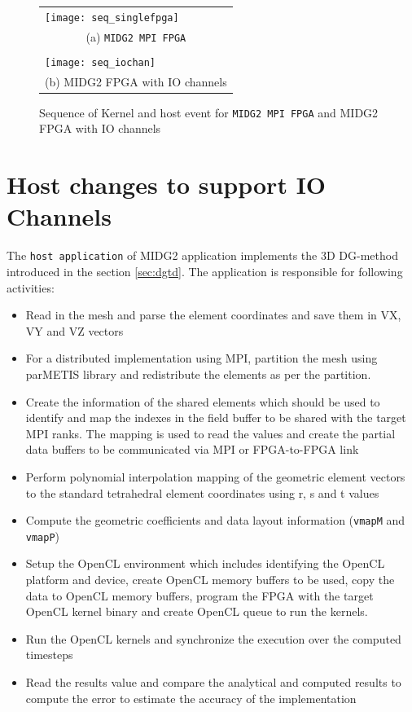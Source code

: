 \begin{figure}[h]
	\centering\small
	\begin{tabular}{l@{\hskip 0.5in}}
        \texttt{[image: seq\_singlefpga]} \\
        \multicolumn{1}{c}{(a) \texttt{MIDG2 MPI FPGA}}  \\
        \\
        \texttt{[image: seq\_iochan]} \\
        \multicolumn{1}{c}{(b) MIDG2 FPGA with IO channels}
	\end{tabular}
    \caption{Sequence of Kernel and host event for \texttt{MIDG2 MPI FPGA}
    and MIDG2 FPGA with IO channels}
	\label{fig:sequence_comp}
\end{figure}

\section{Host changes to support IO Channels}

The \texttt{host application} of MIDG2 application implements the 3D DG-method introduced in the section \ref{sec:dgtd}.
The application is responsible for following activities:

\begin{itemize}
    \item Read in the mesh and parse the element coordinates and save them in VX, VY and VZ vectors
    \item For a distributed implementation using MPI, partition the mesh using parMETIS library
    and redistribute the elements as per the partition.
    \item Create the information of the shared elements which should be used to identify and map the
    indexes in the field buffer to be shared with the target MPI ranks. The mapping is used to read the
    values and create the partial data buffers to be communicated via MPI or FPGA-to-FPGA link
    \item Perform polynomial interpolation mapping of the geometric element vectors to the standard tetrahedral
    element coordinates using r, s and t values
    \item Compute the geometric coefficients and data layout information (\texttt{vmapM} and \texttt{vmapP})
    \item Setup the OpenCL environment which includes identifying the OpenCL platform and device,
    create OpenCL memory buffers to be used, copy the data to OpenCL memory buffers, program the FPGA with the
    target OpenCL kernel binary and create OpenCL queue to run the kernels.
    \item Run the OpenCL kernels and synchronize the execution over the computed timesteps
    \item Read the results value and compare the analytical and computed results to compute the error
    to estimate the accuracy of the implementation
\end{itemize}

